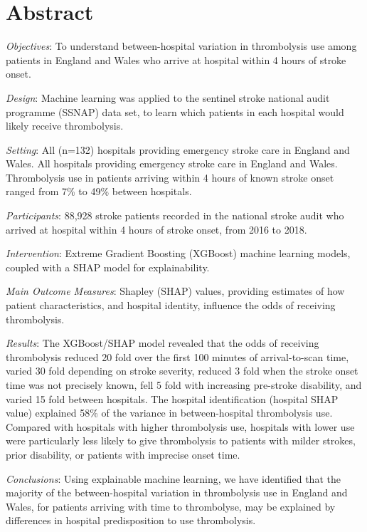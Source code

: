 \section*{Abstract}

\emph{Objectives}: To understand between-hospital variation in thrombolysis use among patients in England and Wales who arrive at hospital within 4 hours of stroke onset.

\emph{Design}: Machine learning was applied to the sentinel stroke national audit programme (SSNAP)  data set, to learn which patients in each hospital would likely receive thrombolysis.

\emph{Setting}: All (n=132) hospitals providing emergency stroke care in England and Wales. All hospitals providing emergency stroke care in England and Wales. Thrombolysis use in patients arriving within 4 hours of known stroke onset ranged from 7\% to 49\% between hospitals.

\emph{Participants}: 88,928 stroke patients recorded in the national stroke audit who arrived at hospital within 4 hours of stroke onset, from 2016 to 2018.

\emph{Intervention}: Extreme Gradient Boosting (XGBoost) machine learning models, coupled with a SHAP model for explainability.

\emph{Main Outcome Measures}: Shapley (SHAP) values, providing estimates of how patient characteristics, and hospital identity, influence the odds of receiving thrombolysis.

\emph{Results}: The XGBoost/SHAP model revealed that the odds of receiving thrombolysis reduced 20 fold over the first 100 minutes of arrival-to-scan time, varied 30 fold depending on stroke severity, reduced 3 fold when the stroke onset time was not precisely known, fell 5 fold with increasing pre-stroke disability, and varied 15 fold between hospitals. The hospital identification (hospital SHAP value) explained 58\% of the variance in between-hospital thrombolysis use. Compared with hospitals with higher thrombolysis use, hospitals with lower use were particularly less likely to give thrombolysis to patients with milder strokes, prior disability, or patients with imprecise onset time.

\emph{Conclusions}: Using explainable machine learning, we have identified that the majority of the between-hospital variation in thrombolysis use in England and Wales, for patients arriving with time to thrombolyse, may be explained by differences in hospital predisposition to use thrombolysis.